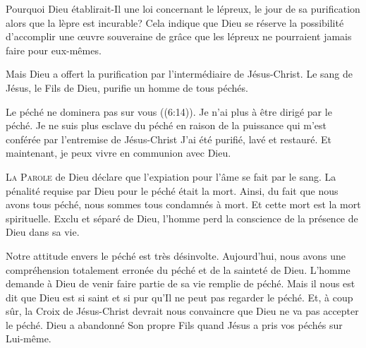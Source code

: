 Pourquoi Dieu établirait-Il une loi concernant le lépreux,
 le jour de sa purification alors que la lèpre est incurable?
 Cela indique que Dieu se réserve la possibilité d'accomplir
 une \oe{}uvre souveraine de grâce que les lépreux ne pourraient
 jamais faire pour eux-mêmes. 


Mais Dieu a offert la purification par l'intermédiaire de Jésus-Christ.
 Le sang de Jésus, le Fils de Dieu, purifie un homme de tous péchés. 

\Og Le péché ne dominera pas sur vous \Fg{} ((6:14)).
 Je n'ai plus à être dirigé par le péché.
 Je ne suis plus esclave du péché en raison de la puissance
 qui m'est conférée par l'entremise de Jésus-Christ
 \ocadr{}J'ai été purifié, lavé et restauré.
 Et maintenant, je peux vivre en communion avec Dieu. 

\dvrule







\lettrine{L}{a Parole} de Dieu déclare que l'expiation
 pour l'âme se fait par le sang.
 La pénalité requise par Dieu pour le péché était la mort.
 Ainsi, du fait que nous avons tous péché,
 nous sommes tous condamnés à mort.
 Et cette mort est la mort spirituelle. Exclu et séparé de Dieu,
 l'homme perd la conscience de la présence de Dieu dans sa vie. 

Notre attitude envers le péché est très désinvolte.
 Aujourd'hui, nous avons une compréhension totalement erronée du péché
 et de la sainteté de Dieu.
 L'homme demande à Dieu de venir faire partie de sa vie remplie de péché.
 Mais il nous est dit que Dieu est si saint et si pur
 qu'Il ne peut pas regarder le péché.
 Et, à coup sûr, la Croix de Jésus-Christ devrait nous convaincre
 que Dieu ne va pas accepter le péché.
 Dieu a abandonné Son propre Fils quand Jésus a pris vos péchés
 sur Lui-même.

